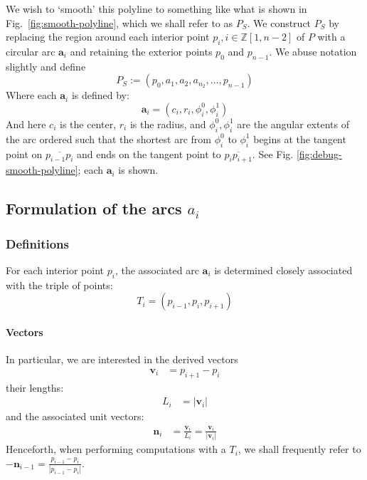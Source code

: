 \documentclass{article}
\begin{document}
%
We wish to `smooth' this polyline to something like what is shown in Fig.~\ref{fig:smooth-polyline}, which we shall refer to as $P_S$.  We construct $P_S$ by replacing the region around each interior point $p_{i}, i \in \mathbb{Z}\left[1, n-2\right]$ of $P$ with a circular arc $\mathbf{a}_{i}$ and retaining the exterior points $p_0$ and $p_{n-1}$.  We abuse notation slightly and define
%
\begin{equation}
  \label{eq:p-smooth}
  P_S := \left(p_0, a_1, a_2, a_{n_2}, \ldots, p_{n-1}\right)
\end{equation}
%
Where each $\mathbf{a}_{i}$ is defined by:
%
\begin{equation}
  \label{eq:circ-def}
\mathbf{a}_i=\left(
  c_{i},
  r_{i},
  \phi^{0}_{i},
  \phi^{1}_{i}
\right)
\end{equation}
%
And here $c_{i}$ is the center, $r_{i}$ is the radius, and $\phi^{0}_{i}, \phi^{1}_{i}$ are the angular extents of the arc ordered such that the shortest arc from $\phi^0_i$ to $\phi^1_i$ begins at the tangent point on $\overline{p_{i-1}p_i}$ and ends on the tangent point to $\overline{p_ip_{i+1}}$.  See Fig. \ref{fig:debug-smooth-polyline}; each $\mathbf{a}_{i}$ is shown.
%
\subsection{Formulation of the arcs $a_{i}$}
\label{sec:formulation-arcs}
%
\subsubsection{Definitions}
%
For each interior point $p_{i}$, the associated arc $\mathbf{a}_{i}$ is determined closely associated with the triple of points:
%
\begin{equation}
  \label{eq:arc-triple}
  T_{i} = \left(p_{i-1}, p_{i}, p_{i+1}\right)
\end{equation}
%
\paragraph{Vectors}
%
In particular, we are interested in the derived vectors
%
\begin{align}
  \label{eq:vector-f}
  \mathbf{v}_{i} &= p_{i+1} - p_{i}
\end{align}
%
their lengths:
%
\begin{align}
  \label{eq:vector-length-f}
  L_{i} &= \left|\mathbf{v}_{i}\right|
\end{align}
%
and the associated unit vectors:
%
\begin{align}
  \label{eq:unit-vectors-f}
  \mathbf{n}_{i} &= \frac{\mathbf{v}_{i}}{L_{i}} =\frac{\mathbf{v}_{i}}{\left|\mathbf{v}_{i}\right|}
\end{align}
%
Henceforth, when performing computations with a $T_i$, we shall frequently refer to $-\mathbf{n}_{i-1} = \frac{p_{i-1}-p_i}{\left|p_{i-1}-p_i\right|}$.
%
\end{document}
